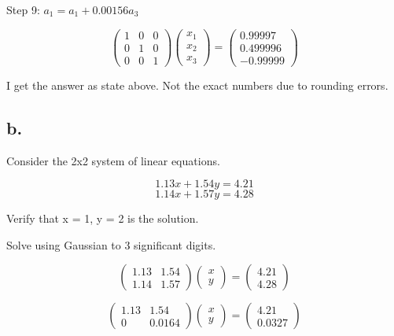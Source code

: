 \documentclass[]{article}
\begin{document}
Step 9: \(a_1 = a_1 + 0.00156a_3\)

\[
\left(\begin{array}{ccc} 
1 & 0 & 0\\
0 & 1 & 0\\
0 & 0 & 1
\end{array}\right)
\left(\begin{array}{c} 
x_1 \\
x_2 \\
x_3
\end{array}\right) =
\left(\begin{array}{c}
0.99997 \\
0.499996 \\
-0.99999
\end{array}\right)
\]

I get the answer as state above. Not the exact numbers due to rounding
errors.

\subsection{b.}\label{b.}

Consider the 2x2 system of linear equations.

\[1.13x + 1.54y = 4.21\] \[1.14x + 1.57y = 4.28\]

Verify that x = 1, y = 2 is the solution.

Solve using Gaussian to 3 significant digits.

\[
\left(\begin{array}{ccc} 
1.13 & 1.54 \\
1.14 & 1.57
\end{array}\right)
\left(\begin{array}{c} 
x \\
y
\end{array}\right) =
\left(\begin{array}{c}
4.21 \\
4.28
\end{array}\right)
\]

\[
\left(\begin{array}{ccc} 
1.13 & 1.54 \\
0 & 0.0164
\end{array}\right)
\left(\begin{array}{c} 
x \\
y
\end{array}\right) =
\left(\begin{array}{c}
4.21 \\
0.0327
\end{array}\right)
\]
\end{document}
